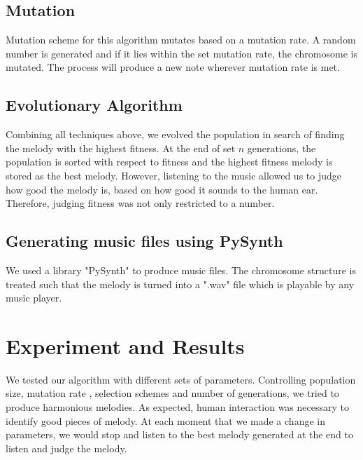 \documentclass[conference]{IEEEtran}
\begin{document}
\subsection{Mutation}
Mutation scheme for this algorithm mutates based on a mutation rate. A random number is generated and if it lies within the set mutation rate, the chromosome is mutated. The process will produce a new note wherever mutation rate is met.

\subsection{Evolutionary Algorithm}
Combining all techniques above, we evolved the population in search of finding the melody with the highest fitness. At the end of set $n$ generations, the population is sorted with respect to fitness and the highest fitness melody is stored as the best melody. However, listening to the music allowed us to judge how good the melody is, based on how good it sounds to the human ear. Therefore, judging fitness was not only restricted to a number.

\subsection{Generating music files using PySynth}
We used a library "PySynth" to produce music files. The chromosome structure is treated such that the melody is turned into a ".wav" file which is playable by any music player.


\section{Experiment and Results}
We tested our algorithm with different sets of parameters. Controlling population size, mutation rate , selection schemes and number of generations, we tried to produce harmonious melodies. As expected, human interaction was necessary to identify good pieces of melody. At each moment that we made a change in parameters, we would stop and listen to the best melody generated at the end to listen and judge the melody.
\end{document}
